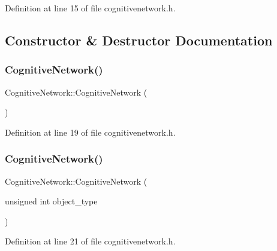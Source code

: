 Definition at line 15 of file cognitivenetwork.\+h.



\subsection{Constructor \& Destructor Documentation}
\mbox{\label{class_cognitive_network_a3daddb316744336648d317e7f71ed371}} 
\subsubsection{\texorpdfstring{Cognitive\+Network()}{CognitiveNetwork()}\hspace{0.1cm}{\footnotesize\ttfamily [1/4]}}
{\footnotesize\ttfamily Cognitive\+Network\+::\+Cognitive\+Network (\begin{DoxyParamCaption}{ }\end{DoxyParamCaption})\hspace{0.3cm}{\ttfamily [inline]}}



Definition at line 19 of file cognitivenetwork.\+h.

\mbox{\label{class_cognitive_network_a167b15e33bcbca43cb0a516159e890f2}} 
\subsubsection{\texorpdfstring{Cognitive\+Network()}{CognitiveNetwork()}\hspace{0.1cm}{\footnotesize\ttfamily [2/4]}}
{\footnotesize\ttfamily Cognitive\+Network\+::\+Cognitive\+Network (\begin{DoxyParamCaption}\item[{unsigned int}]{object\+\_\+type }\end{DoxyParamCaption})\hspace{0.3cm}{\ttfamily [inline]}}



Definition at line 21 of file cognitivenetwork.\+h.


